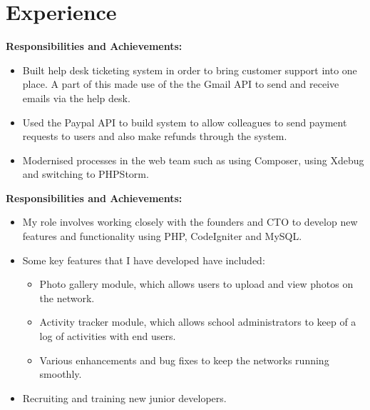 \documentclass[11pt,a4paper,sans]{moderncv}
\begin{document}
\section{Experience}
\textbf{Responsibilities and Achievements:}%
\begin{itemize}%
\item Built help desk ticketing system in order to bring customer support into one place. A part of this made use of the the Gmail API to send and receive emails via the help desk.
\item Used the Paypal API to build system to allow colleagues to send payment requests to users and also make refunds through the system.
\item Modernised processes in the web team such as using Composer, using Xdebug and switching to PHPStorm.  \\  
\end{itemize}%

\textbf{Responsibilities and Achievements:}%
\begin{itemize}%
\item My role involves working closely with the founders and CTO to develop new features and functionality using PHP, CodeIgniter and MySQL.
\item Some key features that I have developed have included:
	\begin{itemize}%
		\item Photo gallery module, which allows users to upload and view photos on the network. 
		\item Activity tracker module, which allows school administrators to keep of a log of activities with end users.
		\item Various enhancements and bug fixes to keep the networks running smoothly.
	\end{itemize}
\item Recruiting and training new junior developers.\\
\end{itemize}
\end{document}

